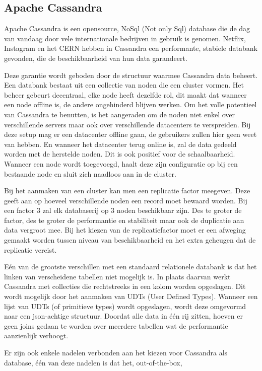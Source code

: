 \documentclass{article}
\begin{document}
	\subsection{Apache Cassandra}
	Apache Cassandra is een opensource, NoSql (Not only Sql) database die de dag van vandaag door vele internationale bedrijven 
	in gebruik is genomen. 
	Netflix, Instagram en het CERN hebben in Cassandra een performante, stabiele databank gevonden, 
	die de beschikbaarheid van hun data garandeert.
	\par
	Deze garantie wordt geboden door de structuur waarmee Cassandra data beheert. 
	Een databank bestaat uit een collectie van noden die een cluster vormen. 
	Het beheer gebeurt decentraal, elke node heeft dezelfde rol, 
	dit maakt dat wanneer een node offline is, de andere ongehinderd blijven werken. 
	Om het volle potentieel van Cassandra te benutten, is het aangeraden om de noden niet enkel over verschillende servers 
	maar ook over verschillende datacenters te verspreiden. 
	Bij deze setup mag er een datacenter offline gaan, de gebruikers zullen hier geen weet van hebben.  
	En wanneer het datacenter terug online is, zal de data gedeeld worden met de herstelde noden.
	Dit is ook positief voor de schaalbaarheid. 
	Wanneer een node wordt toegevoegd, haalt deze zijn configuratie op bij een bestaande node en sluit zich naadloos aan in de cluster.
	\par
	Bij het aanmaken van een cluster kan men een replicatie factor meegeven. 
	Deze geeft aan op hoeveel verschillende noden een record moet bewaard worden. 
	Bij een factor 3 zal elk databaserij op 3 noden beschikbaar zijn. 
	Des te groter de factor, des te groter de performantie en stabiliteit maar ook de duplicatie aan data vergroot mee.
	Bij het kiezen van de replicatiefactor moet er een afweging gemaakt worden tussen niveau van beschikbaarheid en
	het extra geheugen dat de replicatie vereist.
	\par
	Eén van de grootste verschillen met een standaard relationele databank is dat het linken van verscheidene tabellen niet mogelijk is.
	In plaats daarvan werkt Cassandra met collecties die rechtstreeks in een kolom worden opgeslagen. 
	Dit wordt mogelijk door het aanmaken van UDTs (User Defined Types). 
	Wanneer een lijst van UDTs (of primitieve types) wordt opgeslagen, wordt deze omgevormd naar een json-achtige structuur. 
	Doordat alle data in één rij zitten, hoeven er geen joins gedaan te worden over meerdere tabellen 
	wat de performantie aanzienlijk verhoogt.
	\par
	Er zijn ook enkele nadelen verbonden aan het kiezen voor Cassandra als database, één van deze nadelen is dat het, out-of-the-box,
\end{document}
